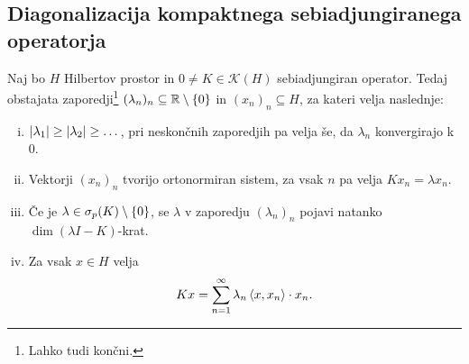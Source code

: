 \newpage

\subsection{Diagonalizacija kompaktnega sebiadjungiranega operatorja}

\begin{izrek}
Naj bo $H$ Hilbertov prostor in $0 \ne K \in \mathcal{K}(H)$
sebiadjungiran operator. Tedaj obstajata zaporedji\footnote{Lahko
tudi končni.} $(\lambda_n)_n \subseteq \mathbb{R} \setminus \left\{0\right\}$ in
$(x_n)_n \subseteq H$, za kateri velja naslednje:

\begin{enumerate}[i)]
\item $\left\lvert \lambda_1\right\rvert \geq \left\lvert \lambda_2\right\rvert \geq \dots$, pri
neskončnih zaporedjih pa velja še, da $\lambda_n$ konvergirajo k
$0$.
\item Vektorji $(x_n)_n$ tvorijo ortonormiran sistem, za vsak $n$
pa velja $K x_n = \lambda x_n$.
\item Če je $\lambda \in \sigma_p(K) \setminus \left\{0\right\}$, se
$\lambda$ v zaporedju $(\lambda_n)_n$ pojavi natanko
$\dim (\lambda I - K)$-krat.
\item Za vsak $x \in H$ velja
\[
K x = \sum_{n=1}^\infty \lambda_n \left\langle x, x_n\right\rangle \cdot x_n.
\]
\end{enumerate}
\end{izrek}

